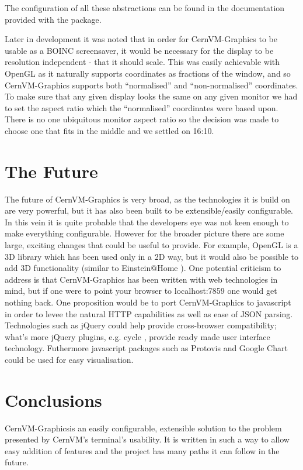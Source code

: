 \documentclass[twocolumn,aps]{revtex4}
\makeatletter
\newcommand{\cernvm}{CernVM}
\newcommand{\cernvmgraphics}{\cernvm{}-Graphics}
\newcommand{\boinc}{BOINC}
\newcommand{\opengl}{OpenGL}
\newcommand{\json}{JSON}
\newcommand{\vmport}{7859}
\newcommand{\einsteinathome}{Einstein@Home}
\newcommand{\jquery}{jQuery}
\newcommand{\protovis}{Protovis}
\newcommand{\googlechart}{Google Chart}
\makeatother
\begin{document}
    The configuration of all these abstractions can be found in the
    documentation provided with the package.
    
    Later in development it was noted that in order for \cernvmgraphics{} to
    be usable as a \boinc{} screensaver, it would be necessary for the
    display to be resolution independent - that it should scale. This was
    easily achievable with \opengl{} as it naturally supports coordinates as
    fractions of the window, and so \cernvmgraphics{} supports both
    ``normalised'' and ``non-normalised'' coordinates. To make sure that any
    given display looks the same on any given monitor we had to set the
    aspect ratio which the ``normalised'' coordinates were based upon.
    There is no one ubiquitous monitor aspect ratio so the decision was made
    to choose one that fits in the middle and we settled on 16:10.

  \section{ The Future }
    The future of \cernvmgraphics{} is very broad, as the technologies it is
    build on are very powerful, but it has also been built to be 
    extensible/easily configurable. In this vein it is quite probable that
    the developers eye was not keen enough to make everything configurable.
    However for the broader picture there are some large, exciting changes
    that could be useful to provide. For example, \opengl{} is a 3D library
    which has been used only in a 2D way, but it would also be possible to
    add 3D functionality (similar to \einsteinathome{} \cite{einsteinathome}
    ). One potential criticism to address is that \cernvmgraphics{} has been
    written with web technologies in mind, but if one were to point your
    browser to localhost:\vmport{} one would get nothing back. One
    proposition would be to port \cernvmgraphics{} to javascript in order to
    levee the natural HTTP capabilities as well as ease of \json{} parsing.
    Technologies such as \jquery{} \cite{jquery} could help provide 
    cross-browser compatibility; what's more \jquery{} plugins, e.g. cycle
    \cite{jquery-cycle}, provide ready made user interface technology.
    Futhermore javascript packages such as \protovis{} \cite{protovis} and
    \googlechart{} \cite{gchart} could be used for easy visualisation.

  \section{ Conclusions }
    \cernvmgraphics is an easily configurable, extensible solution to the
    problem presented by \cernvm{}'s terminal's usability. It is written in
    such a way to allow easy addition of features and the project has many 
    paths it can follow in the future.
\end{document}
